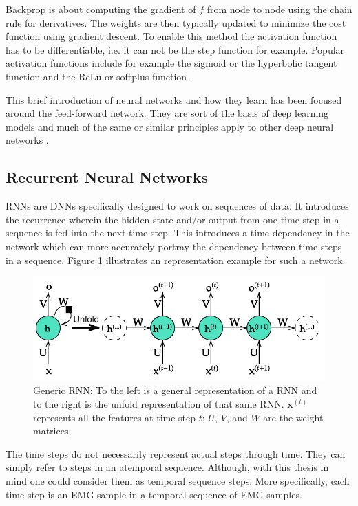 \documentclass[../main.tex]{subfiles}
\begin{document}
Backprop is about computing the gradient of $f$ from node to node using the chain rule for derivatives. 
The weights are then typically updated to minimize the cost function using gradient descent.
To enable this method the activation function has to be differentiable, i.e. it can not be the step function for example.
Popular activation functions include for example the sigmoid or the hyperbolic tangent function and the ReLu or softplus function \cite{Goodfellow2016, Haykin2009, Rojas1996}.

This brief introduction of neural networks and how they learn has been focused around the feed-forward network.
They are sort of the basis of deep learning models and much of the same or similar principles apply to other deep neural networks \cite{Goodfellow2016}.

\subsection{Recurrent Neural Networks}
\label{sec:A-rnn}
\Acp{RNN} are \acp{DNN} specifically designed to work on sequences of data.
It introduces the recurrence wherein the hidden state and/or output from one time step in a sequence is fed into the next time step.
This introduces a time dependency in the network which can more accurately portray the dependency between time steps in a sequence.
Figure \ref{fig:generic-rnn} illustrates an representation example for such a network.
\begin{figure}[ht]
    \centering
    \includegraphics{img/generic-rnn-diagram}
    \caption{Generic \ac{RNN}: To the left is a general representation of a \ac{RNN} and to the right is the unfold representation of that same \ac{RNN}. $\mathbf{x}^{(t)}$ represents all the features at time step $t$; $U$, $V$, and $W$ are the weight matrices;}
    \label{fig:generic-rnn}
\end{figure}

The time steps do not necessarily represent actual steps through time.
They can simply refer to steps in an atemporal sequence.
Although, with this thesis in mind one could consider them as temporal sequence steps.
More specifically, each time step is an \ac{EMG} sample in a temporal sequence of \ac{EMG} samples.
\end{document}
